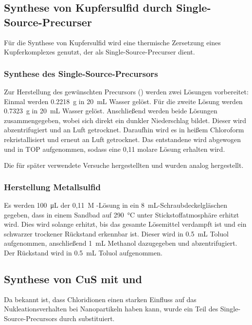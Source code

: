 	\subsection{Synthese von Kupfersulfid durch Single-Source-Precurser}
	Für die Synthese von Kupfersulfid wird eine thermische Zersetzung eines Kupferkomplexes genutzt, der als Single-Source-Precurser dient. \autocite{JenLaPlante2010}
	\subsubsection{Synthese des Single-Source-Precursors }
	Zur Herstellung des gewünschten Precursors () werden zwei Lösungen vorbereitet: 
	Einmal werden \SI{0,2218}{\gram}  in \SI{20}{\milli\liter} Wasser gelöst.
	Für die zweite Lösung werden \SI{0,7323}{\gram}  in \SI{20}{\milli\liter} Wasser gelöst.
	Anschließend werden beide Lösungen zusammengegeben, wobei sich direkt ein dunkler Niederschlag bildet.
	Dieser wird abzentrifugiert und an Luft getrocknet.
	Daraufhin wird es in heißem Chloroform rekristallisiert und erneut an Luft getrocknet.
	Das entstandene  wird abgewogen und in TOP aufgenommen, sodass eine 0,11 molare Lösung erhalten wird.
	
	Die für später verwendete Versuche hergestellten  und  wurden analog hergestellt.
	
	
	\subsubsection{Herstellung Metallsulfid}
	Es werden \SI{100}{\micro\liter} der 0,11~M -Lösung in ein \SI{8}{\milli\liter}-Schraubdeckelgläschen gegeben, dass in einem Sandbad auf \SI{290}{\degreeCelsius} unter Stickstoffatmosphäre erhitzt wird.
	Dies wird solange erhitzt, bis das gesamte Lösemittel verdampft ist und ein schwarzer trockener Rückstand erkennbar ist.
	Dieser wird in \SI{0,5}{\milli\liter} Toluol aufgenommen, anschließend \SI{1}{\milli\liter} Methanol dazugegeben und abzentrifugiert.
	Der Rückstand wird in \SI{0,5}{\milli\liter} Toluol aufgenommen.
	
	\subsection{Synthese von CuS mit  und }
	Da bekannt ist, dass Chloridionen einen starken Einfluss auf das Nukleationsverhalten bei Nanopartikeln haben kann\autocite{Hinrichs2016}, wurde ein Teil des Single-Source-Precursors durch  substituiert.
	
